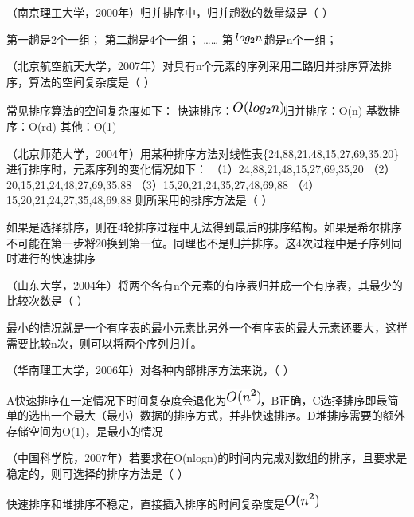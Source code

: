 \question （南京理工大学，2000年）归并排序中，归并趟数的数量级是（ ）
\par\fourch{}{\textcolor{red}{}}{}{}
\begin{solution}第一趟是2个一组； 第二趟是4个一组； \ldots{}\ldots{}
第\includegraphics[width=0.40625in,height=0.14583in]{texmath/11a3d45Cdpi7B3507Dlog_2n}趟是n个一组；
\end{solution}
\question （北京航空航天大学，2007年）对具有n个元素的序列采用二路归并排序算法排序，算法的空间复杂度是（
）
\par\fourch{\textcolor{red}{}}{}{}{}
\begin{solution}常见排序算法的空间复杂度如下：
快速排序：\includegraphics[width=0.65625in,height=0.18750in]{texmath/39368f5Cdpi7B3507DO28log_2n29}归并排序：O(n)
基数排序：O(rd) 其他：O(1)
\end{solution}
\question （北京师范大学，2004年）用某种排序方法对线性表\{24,88,21,48,15,27,69,35,20\}进行排序时，元素序列的变化情况如下：
（1）24,88,21,48,15,27,69,35,20 （2）20,15,21,24,48,27,69,35,88
（3）15,20,21,24,35,27,48,69,88 （4）15,20,21,24,27,35,48,69,88
则所采用的排序方法是（ ）
\par{}
\begin{solution}如果是选择排序，则在4轮排序过程中无法得到最后的排序结构。如果是希尔排序不可能在第一步将20换到第一位。同理也不是归并排序。这4次过程中是子序列同时进行的快速排序
\end{solution}
\question （山东大学，2004年）将两个各有n个元素的有序表归并成一个有序表，其最少的比较次数是（
）
\par{}
\begin{solution}最小的情况就是一个有序表的最小元素比另外一个有序表的最大元素还要大，这样需要比较n次，则可以将两个序列归并。
\end{solution}
\question （华南理工大学，2006年）对各种内部排序方法来说，（ ）
\par{}
\begin{solution}A快速排序在一定情况下时间复杂度会退化为\includegraphics[width=0.43750in,height=0.19792in]{texmath/ead2f65Cdpi7B3507DO28n5E229}，B正确，C选择排序即最简单的选出一个最大（最小）数据的排序方式，并非快速排序。D堆排序需要的额外存储空间为O(1)，是最小的情况
\end{solution}
\question （中国科学院，2007年）若要求在O(nlogn)的时间内完成对数组的排序，且要求是稳定的，则可选择的排序方法是（
）
\par{}
\begin{solution}快速排序和堆排序不稳定，直接插入排序的时间复杂度是\includegraphics[width=0.43750in,height=0.19792in]{texmath/ead2f65Cdpi7B3507DO28n5E229}
\end{solution}
